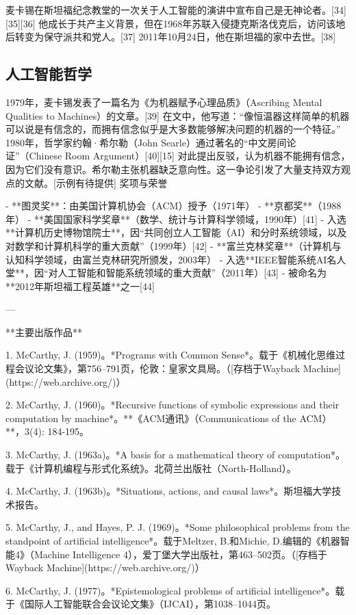 麦卡锡在斯坦福纪念教堂的一次关于人工智能的演讲中宣布自己是无神论者。[34][35][36] 他成长于共产主义背景，但在1968年苏联入侵捷克斯洛伐克后，访问该地后转变为保守派共和党人。[37] 2011年10月24日，他在斯坦福的家中去世。[38]
\subsection{人工智能哲学}
1979年，麦卡锡发表了一篇名为《为机器赋予心理品质》（Ascribing Mental Qualities to Machines）的文章。[39] 在文中，他写道：“像恒温器这样简单的机器可以说是有信念的，而拥有信念似乎是大多数能够解决问题的机器的一个特征。” 1980年，哲学家约翰·希尔勒（John Searle）通过著名的“中文房间论证”（Chinese Room Argument）[40][15] 对此提出反驳，认为机器不能拥有信念，因为它们没有意识。希尔勒主张机器缺乏意向性。这一争论引发了大量支持双方观点的文献。[示例有待提供]
奖项与荣誉

- **图灵奖**：由美国计算机协会（ACM）授予（1971年）  
- **京都奖**（1988年）  
- **美国国家科学奖章**（数学、统计与计算科学领域，1990年）[41]  
- 入选**计算机历史博物馆院士**，因“共同创立人工智能（AI）和分时系统领域，以及对数学和计算机科学的重大贡献”（1999年）[42]  
- **富兰克林奖章**（计算机与认知科学领域，由富兰克林研究所颁发，2003年）  
- 入选**IEEE智能系统AI名人堂**，因“对人工智能和智能系统领域的重大贡献”（2011年）[43]  
- 被命名为**2012年斯坦福工程英雄**之一[44]  

---

**主要出版作品**

1. McCarthy, J. (1959)。*Programs with Common Sense*。载于《机械化思维过程会议论文集》，第756–791页，伦敦：皇家文具局。（[存档于Wayback Machine](https://web.archive.org/)）

2. McCarthy, J. (1960)。*Recursive functions of symbolic expressions and their computation by machine*。**《ACM通讯》（Communications of the ACM）**，3(4): 184-195。

3. McCarthy, J. (1963a)。*A basis for a mathematical theory of computation*。载于《计算机编程与形式化系统》。北荷兰出版社（North-Holland）。

4. McCarthy, J. (1963b)。*Situations, actions, and causal laws*。斯坦福大学技术报告。

5. McCarthy, J., and Hayes, P. J. (1969)。*Some philosophical problems from the standpoint of artificial intelligence*。载于Meltzer, B.和Michie, D.编辑的《机器智能4》（Machine Intelligence 4），爱丁堡大学出版社，第463–502页。（[存档于Wayback Machine](https://web.archive.org/)）

6. McCarthy, J. (1977)。*Epistemological problems of artificial intelligence*。载于《国际人工智能联合会议论文集》（IJCAI），第1038–1044页。

